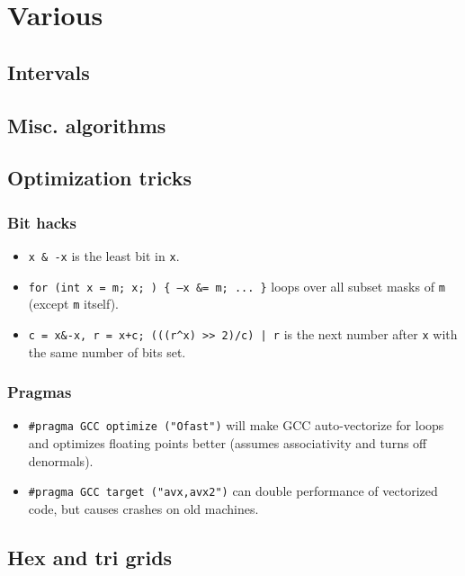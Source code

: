 \chapter{Various}

\section{Intervals}

\section{Misc. algorithms}

\section{Optimization tricks}
	\subsection{Bit hacks}
		\begin{itemize}
		\item \texttt{x \& -x} is the least bit in \texttt{x}.
		\item \texttt{for (int x = m; x; ) \{ --x \&= m; ... \}} loops over all subset masks of \texttt{m} (except \texttt{m} itself).
		\item \texttt{c = x\&-x, r = x+c; (((r\^{}x) >> 2)/c) | r} is the next number after \texttt{x} with the same number of bits set.
		\end{itemize}
	\subsection{Pragmas}
		\begin{itemize}
			\item \lstinline{#pragma GCC optimize ("Ofast")} will make GCC auto-vectorize for loops and optimizes floating points better (assumes associativity and turns off denormals).
			\item \lstinline{#pragma GCC target ("avx,avx2")} can double performance of vectorized code, but causes crashes on old machines.
		\end{itemize}

\section{Hex and tri grids}
